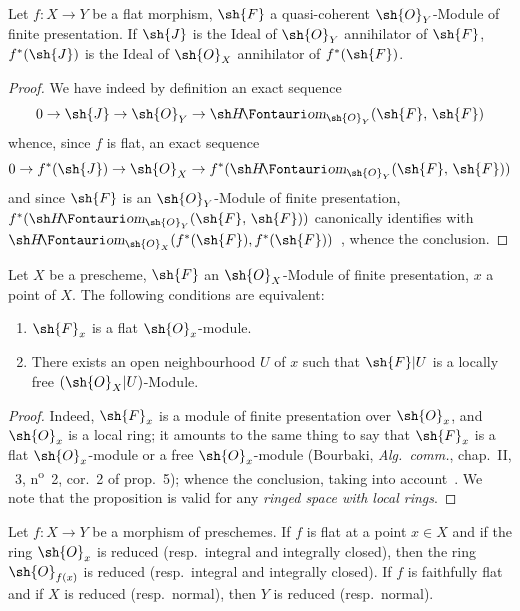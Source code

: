 \begin{proposition}[2.1.11]
\label{IV.2.1.11}
Let $f:X\to Y$ be a flat morphism, $\sh{F}$ a quasi-coherent $\sh{O}_Y$-Module of finite presentation.
If $\sh{J}$ is the Ideal of $\sh{O}_Y$ annihilator of $\sh{F}$, $f^*(\sh{J})$ is the Ideal of $\sh{O}_X$ annihilator of $f^*(\sh{F})$.
\end{proposition}

\begin{proof}
We have indeed by definition an exact sequence~
\[
  0\to\sh{J}\to\sh{O}_Y\to\shHom_{\sh{O}_Y}(\sh{F},\,\sh{F})
\]
whence, since $f$ is flat, an exact sequence
\[
  0\to f^*(\sh{J})\to\sh{O}_X\to f^*(\shHom_{\sh{O}_Y}(\sh{F},\,\sh{F}))
\]
and since $\sh{F}$ is an $\sh{O}_Y$-Module of finite presentation, $f^*(\shHom_{\sh{O}_Y}(\sh{F},\,\sh{F}))$ canonically identifies with $\shHom_{\sh{O}_X}(f^*(\sh{F}),f^*(\sh{F}))$~, whence the conclusion.
\end{proof}

\begin{proposition}[2.1.12]
\label{IV.2.1.12}
Let $X$ be a prescheme, $\sh{F}$ an $\sh{O}_X$-Module of finite presentation, $x$ a point of $X$.
The following conditions are equivalent:
\begin{enumerate}
  \item[\emph{a)}] $\sh{F}_x$ is a flat $\sh{O}_x$-module.
  \item[\emph{b)}] There exists an open neighbourhood $U$ of $x$ such that $\sh{F}|U$ is a locally free $(\sh{O}_X|U)$-Module.
\end{enumerate}
\end{proposition}

\begin{proof}
Indeed, $\sh{F}_x$ is a module of finite presentation over $\sh{O}_x$, and $\sh{O}_x$ is a local ring; it amounts to the same thing to say that $\sh{F}_x$ is a flat $\sh{O}_x$-module or a free $\sh{O}_x$-module (Bourbaki, \emph{Alg.~comm.}, chap.~II, \textsection~3, n\textsuperscript{o}~2, cor.~2 of prop.~5); whence the conclusion, taking into account~.
We note that the proposition is valid for any \emph{ringed space with local rings}.
\end{proof}

\begin{proposition}[2.1.13]
\label{IV.2.1.13}
Let $f:X\to Y$ be a morphism of preschemes. If $f$ is flat at a point $x\in X$ and if the ring $\sh{O}_x$ is reduced \textnormal{(}resp.\ integral and integrally closed\textnormal{)}, then the ring $\sh{O}_{f(x)}$
is reduced \textnormal{(}resp.\ integral and integrally closed\textnormal{)}.
If $f$ is faithfully flat and if $X$ is reduced \textnormal{(}resp.\ normal\textnormal{)}, then $Y$ is reduced \textnormal{(}resp.\ normal\textnormal{)}.
\end{proposition}

